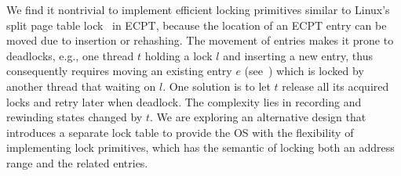 \label{emt:sec:multithreading}
We find it nontrivial to implement efficient 
	locking primitives similar to 
	Linux's split page table lock~\cite{linux:sptl} in ECPT,
	because %
	the location of an ECPT entry can be moved due to insertion or rehashing.
The movement of entries makes it prone to deadlocks, e.g.,	
	one thread $t$ holding a lock $l$ and inserting a new entry,
	thus consequently requires moving an existing entry $e$ (see~\cite{pagh2004cuckoo}) which 
	is locked by another thread that waiting on $l$.
One solution is to let $t$ release all its acquired locks 
	and retry later when deadlock.
The complexity lies in recording and rewinding states changed by $t$.
We are exploring an alternative design that introduces a separate lock table to provide the OS 
	with the flexibility of implementing lock primitives, which has the semantic of locking both an address range 
		and the related entries.


